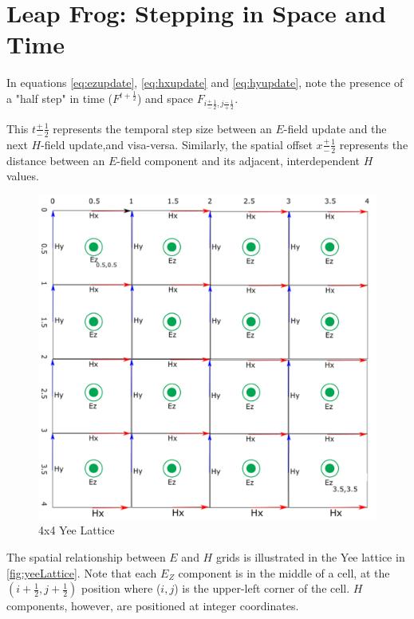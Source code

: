 \clearpage

\section{Leap Frog: Stepping in Space and Time}

In equations \ref{eq:ezupdate}, \ref{eq:hxupdate} and \ref{eq:hyupdate}, note the presence of a "half step" in time ($F^{t + \frac{1}{2}}$) and space $F_{i \frac{+}{-}\frac{1}{2},j \frac{-}{+}\frac{1}{2}}$.

This $t\frac{+}{-}\frac{1}{2}$ represents the temporal step size between an $E$-field update and the next $H$-field update,and visa-versa. Similarly, the spatial offset $x\frac{+}{-}\frac{1}{2}$ represents the distance between an $E$-field component and its adjacent, interdependent $H$ values.


\begin{figure}[H]
	\centering
	\includegraphics[width=15cm,keepaspectratio]{YeeMesh.png}
	\caption{4x4 Yee Lattice}
	\label{fig:yeeLattice}
\end{figure}

The spatial relationship between $E$ and $H$ grids is illustrated in the Yee lattice in \autoref{fig:yeeLattice}. Note that each $E_Z$ component is in the middle of a cell, at the $(i + \frac{1}{2}, j + \frac{1}{2})$ position where ($i,j$) is  the upper-left corner of the cell. $H$ components, however, are positioned at integer coordinates.

